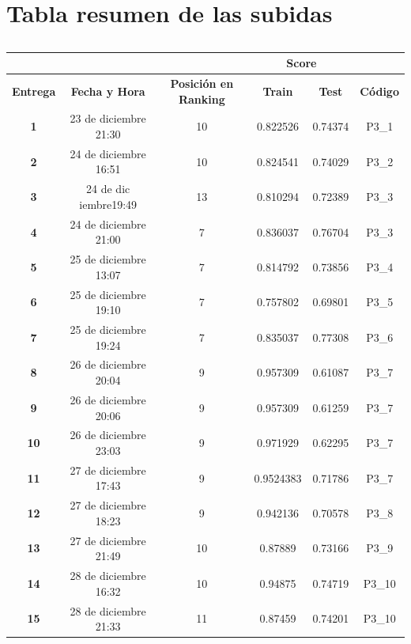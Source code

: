 \documentclass[a4paper,11pt]{article}
\begin{document}
  \section{Tabla resumen de las subidas}
  
  \begin{table}[htbp]
  	\caption{}\begin{center}
  	\begin{tabular}{|c|c|c|c|c|c|}
  		\hline
  		\textbf{} & \textbf{} & \textbf{} & \multicolumn{ 2}{c|}{\textbf{Score}} & \multicolumn{1}{l|}{} \\ \hline
  		\textbf{Entrega} & \textbf{Fecha y Hora} & \textbf{Posición en Ranking} & \textbf{Train} & \textbf{Test} & \textbf{Código} \\ \hline
  		\textbf{1} & 23 de diciembre 21:30 & 10 & 0.822526 & 0.74374 & P3\_1 \\ \hline
  		\textbf{2} & 24 de diciembre 16:51 & 10 & 0.824541 & 0.74029 & P3\_2 \\ \hline
  		\textbf{3} & 24 de dic iembre19:49 & 13 & 0.810294 & 0.72389 & P3\_3 \\ \hline
  		\textbf{4} & 24 de diciembre 21:00 & 7 & 0.836037 & 0.76704 & P3\_3 \\ \hline
  		\textbf{5} & 25 de diciembre 13:07 & 7 & 0.814792 & 0.73856 & P3\_4 \\ \hline
  		\textbf{6} & 25 de diciembre 19:10 & 7 & 0.757802 & 0.69801 & P3\_5 \\ \hline
  		\textbf{7} & 25 de diciembre 19:24 & 7 & 0.835037 & 0.77308 & P3\_6 \\ \hline
  		\textbf{8} & 26 de diciembre 20:04 & 9 & 0.957309 & 0.61087 & P3\_7 \\ \hline
  		\textbf{9} & 26 de diciembre 20:06 & 9 & 0.957309 & 0.61259 & P3\_7 \\ \hline
  		\textbf{10} & 26 de diciembre 23:03 & 9 & 0.971929 & 0.62295 & P3\_7 \\ \hline
  		\textbf{11} & 27 de diciembre  17:43 & 9 & 0.9524383 & 0.71786 & P3\_7 \\ \hline
  		\textbf{12} & 27 de diciembre 18:23 & 9 & 0.942136 & 0.70578 & P3\_8 \\ \hline
  		\textbf{13} & 27 de diciembre 21:49 & 10 & 0.87889 & 0.73166 & P3\_9 \\ \hline
  		\textbf{14} & 28 de diciembre 16:32  & 10 & 0.94875 & 0.74719 & P3\_10 \\ \hline
  		\textbf{15} & 28 de diciembre 21:33  & 11 & 0.87459 & 0.74201 & P3\_10 \\ \hline

\end{tabular}
\end{center}
\end{table}
\end{document}
